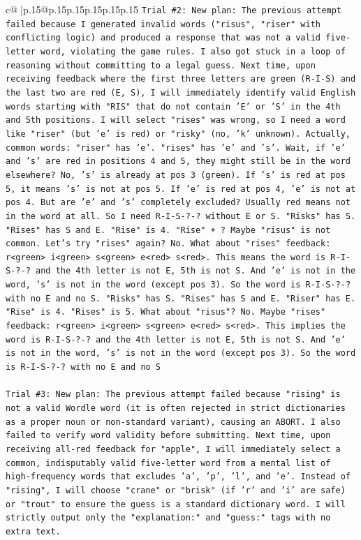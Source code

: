 \documentclass{article}
\begin{document}
{\begin{supertabular}{c@{$\;$}|p{.15\linewidth}@{}p{.15\linewidth}p{.15\linewidth}p{.15\linewidth}p{.15\linewidth}p{.15\linewidth}}
{{{\texttt{Trial \#2: New plan: The previous attempt failed because I generated invalid words ("risus", "riser" with conflicting logic) and produced a response that was not a valid five{-}letter word, violating the game rules. I also got stuck in a loop of reasoning without committing to a legal guess. Next time, upon receiving feedback where the first three letters are green (R{-}I{-}S) and the last two are red (E, S), I will immediately identify valid English words starting with "RIS" that do not contain 'E' or 'S' in the 4th and 5th positions. I will select "rises" was wrong, so I need a word like "riser" (but 'e' is red) or "risky" (no, 'k' unknown). Actually, common words: "riser" has 'e'. "rises" has 'e' and 's'. Wait, if 'e' and 's' are red in positions 4 and 5, they might still be in the word elsewhere? No, 's' is already at pos 3 (green). If 's' is red at pos 5, it means 's' is not at pos 5. If 'e' is red at pos 4, 'e' is not at pos 4. But are 'e' and 's' completely excluded? Usually red means not in the word at all. So I need R{-}I{-}S{-}?{-}? without E or S. "Risks" has S. "Rises" has S and E. "Rise" is 4. "Rise" + ? Maybe "risus" is not common. Let's try "rises" again? No. What about "rises" feedback: r<green> i<green> s<green> e<red> s<red>. This means the word is R{-}I{-}S{-}?{-}? and the 4th letter is not E, 5th is not S. And 'e' is not in the word, 's' is not in the word (except pos 3). So the word is R{-}I{-}S{-}?{-}? with no E and no S. "Risks" has S. "Rises" has S and E. "Riser" has E. "Rise" is 4. "Rises" is 5. What about "risus"? No. Maybe "rises" feedback: r<green> i<green> s<green> e<red> s<red>. This implies the word is R{-}I{-}S{-}?{-}? and the 4th letter is not E, 5th is not S. And 'e' is not in the word, 's' is not in the word (except pos 3). So the word is R{-}I{-}S{-}?{-}? with no E and no S} \\
\\ 
\texttt{Trial \#3: New plan: The previous attempt failed because "rising" is not a valid Wordle word (it is often rejected in strict dictionaries as a proper noun or non{-}standard variant), causing an ABORT. I also failed to verify word validity before submitting. Next time, upon receiving all{-}red feedback for "apple", I will immediately select a common, indisputably valid five{-}letter word from a mental list of high{-}frequency words that excludes 'a', 'p', 'l', and 'e'. Instead of "rising", I will choose "crane" or "brisk" (if 'r' and 'i' are safe) or "trout" to ensure the guess is a standard dictionary word. I will strictly output only the "explanation:" and "guess:" tags with no extra text.} \\
}}}
\end{supertabular}}
\end{document}
